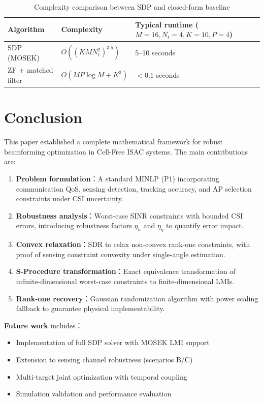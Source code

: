 \documentclass[12pt,a4paper]{article}
\begin{document}
\begin{table}[htbp]
\centering
\caption{Complexity comparison between SDP and closed-form baseline}\label{tab:complexity}
\begin{tabular}{lll}
\toprule
Algorithm & Complexity & Typical runtime ($M=16, N_t=4, K=10, P=4$) \\
\midrule
SDP (MOSEK) & $O((K M N_t^2)^{3.5})$ & 5--10 seconds \\
ZF + matched filter & $O(MP\log M + K^3)$ & $< 0.1$ seconds \\
\bottomrule
\end{tabular}
\end{table}

\section{Conclusion}

This paper established a complete mathematical framework for robust beamforming optimization in Cell-Free ISAC systems. The main contributions are:

\begin{enumerate}
    \item \textbf{Problem formulation}：A standard MINLP (P1) incorporating communication QoS, sensing detection, tracking accuracy, and AP selection constraints under CSI uncertainty.
    \item \textbf{Robustness analysis}：Worst-case SINR constraints with bounded CSI errors, introducing robustness factors $\eta_h$ and $\eta_g$ to quantify error impact.
    \item \textbf{Convex relaxation}：SDR to relax non-convex rank-one constraints, with proof of sensing constraint convexity under single-angle estimation.
    \item \textbf{S-Procedure transformation}：Exact equivalence transformation of infinite-dimensional worst-case constraints to finite-dimensional LMIs.
    \item \textbf{Rank-one recovery}：Gaussian randomization algorithm with power scaling fallback to guarantee physical implementability.
\end{enumerate}

\textbf{Future work} includes：
\begin{itemize}
    \item Implementation of full SDP solver with MOSEK LMI support
    \item Extension to sensing channel robustness (scenarios B/C)
    \item Multi-target joint optimization with temporal coupling
    \item Simulation validation and performance evaluation
\end{itemize}
\end{document}
